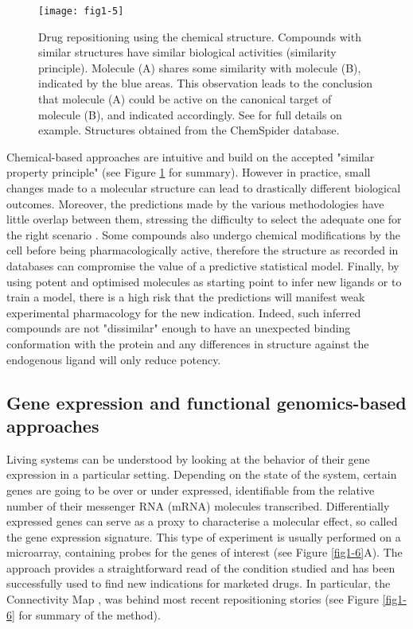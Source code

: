 \begin{figure}[ht]
    \centering
    \texttt{[image: fig1-5]}
    \caption{Drug repositioning using the chemical structure. Compounds with similar structures have similar biological activities (similarity principle). Molecule (A) shares some similarity with molecule (B), indicated by the blue areas. This observation leads to the conclusion that molecule (A) could be active on the canonical target of molecule (B), and indicated accordingly. See \cite{keiser2009predicting} for full details on example. Structures obtained from the ChemSpider database.}
    \label{fig1-5}
\end{figure}

Chemical-based approaches are intuitive and build on the accepted "similar property principle" (see Figure \ref{fig1-5} for summary). However in practice, small changes made to a molecular structure can lead to drastically different biological outcomes. Moreover, the predictions made by the various methodologies have little overlap between them, stressing the difficulty to select the adequate one for the right scenario \citep{eckert2007molecular}. Some compounds also undergo chemical modifications by the cell before being pharmacologically active, therefore the structure as recorded in databases can compromise the value of a predictive statistical model. Finally, by using potent and optimised molecules as starting point to infer new ligands or to train a model, there is a high risk that the predictions will manifest weak experimental pharmacology for the new indication. Indeed, such inferred compounds are not "dissimilar" enough to have an unexpected binding conformation with the protein and any differences in structure against the endogenous ligand will only reduce potency.

\subsection{Gene expression and functional genomics-based approaches}
\label{expression}

Living systems can be understood by looking at the behavior of their gene expression in a particular setting. Depending on the state of the system, certain genes are going to be over or under expressed, identifiable from the relative number of their messenger RNA (mRNA) molecules transcribed. Differentially expressed genes can serve as a proxy to characterise a molecular effect, so called the gene expression signature. This type of experiment is usually performed on a microarray, containing probes for the genes of interest (see Figure \ref{fig1-6}A). The approach provides a straightforward read of the condition studied and has been successfully used to find new indications for marketed drugs. In particular, the Connectivity Map \citep{lamb2006connectivity}, was behind most recent repositioning stories (see Figure \ref{fig1-6} for summary of the method).

